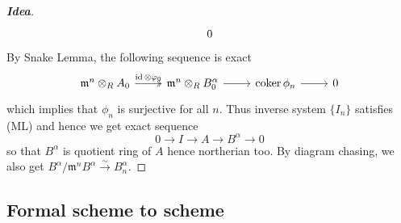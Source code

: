 \documentclass{ctexart}
\newcommand{\identity}{\operatorname{id}}
\newcommand{\coker}{\operatorname{coker}}
\begin{document}
\begin{proof}[\textbf{\emph{Idea}}]
\begin{equation}
\begin{tikzcd}
            0
        \end{tikzcd}
    \end{equation}
    By Snake Lemma, the following sequence is exact
    \begin{equation}
        \begin{tikzcd}
            \mathfrak{m}^{n} \otimes_{R} A_{0} \arrow[r, twoheadrightarrow, "\identity \otimes \varphi_{0}"] &
            \mathfrak{m}^{n} \otimes_{R} B_{0}^{\alpha} \arrow[r] &
            \coker \phi_{n} \arrow[r] &
            0 
        \end{tikzcd}
    \end{equation}
    which implies that $\phi_{n}$ is surjective for all $n$.
    Thus inverse system $\{I_{n}\}$ satisfies (ML) and hence we get exact sequence
    \begin{equation}
        0 \longrightarrow I \longrightarrow A \longrightarrow B^{\alpha} \longrightarrow 0
    \end{equation}
    so that $B^{\alpha}$ is quotient ring of $A$ hence northerian too.
    By diagram chasing, we also get $B^{\alpha}/\mathfrak{m}^{n}B^{\alpha} \overset{\sim}{\rightarrow} B_{n}^{\alpha}$.
\end{proof}

\subsection{Formal scheme to scheme}
\label{subsection:Algebraization_of_Formal_Moduli_Formal_scheme_to_scheme}
\end{document}
